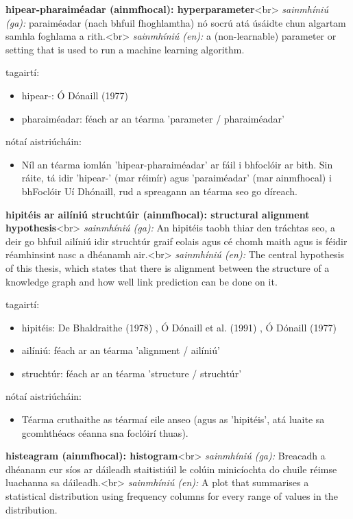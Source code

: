 \documentclass{article}
\begin{document}
\textbf{hipear-pharaiméadar (ainmfhocal): hyperparameter}<br>
\textit{sainmhíniú (ga):} paraiméadar (nach bhfuil fhoghlamtha) nó socrú atá úsáidte chun algartam samhla foghlama a rith.<br>
\textit{sainmhíniú (en):} a (non-learnable) parameter or setting that is used to run a machine learning algorithm.

tagairtí:
\begin{itemize}
	\item hipear-: Ó Dónaill (1977) \cite{odonaill}
	\item pharaiméadar: féach ar an téarma 'parameter / pharaiméadar'
\end{itemize}

nótaí aistriúcháin:
\begin{itemize}
	\item Níl an téarma iomlán 'hipear-pharaiméadar' ar fáil i bhfoclóir ar bith. Sin ráite, tá idir 'hipear-' (mar réimír) agus 'paraiméadar' (mar ainmfhocal) i bhFoclóir Uí Dhónaill, rud a spreagann an téarma seo go díreach.
\end{itemize}


\textbf{hipitéis ar ailíniú struchtúir (ainmfhocal): structural alignment hypothesis}<br>
\textit{sainmhíniú (ga):} An hipitéis taobh thiar den tráchtas seo, a deir go bhfuil ailíniú idir struchtúr graif eolais agus cé chomh maith agus is féidir réamhinsint nasc a dhéanamh air.<br>
\textit{sainmhíniú (en):} The central hypothesis of this thesis, which states that there is alignment between the structure of a knowledge graph and how well link prediction can be done on it.

tagairtí:
\begin{itemize}
	\item hipitéis: De Bhaldraithe (1978) \cite{de-bhaldraithe}, Ó Dónaill et al. (1991) \cite{focloir-beag}, Ó Dónaill (1977) \cite{odonaill}
	\item ailíniú: féach ar an téarma 'alignment / ailíniú'
	\item struchtúr: féach ar an téarma 'structure / struchtúr'
\end{itemize}

nótaí aistriúcháin:
\begin{itemize}
	\item Téarma cruthaithe as téarmaí eile anseo (agus as 'hipitéis', atá luaite sa gcomhthéacs céanna sna foclóirí thuas).
\end{itemize}


\textbf{histeagram (ainmfhocal): histogram}<br>
\textit{sainmhíniú (ga):} Breacadh a dhéanann cur síos ar dáileadh staitistiúil le colúin minicíochta do chuile réimse luachanna sa dáileadh.<br>
\textit{sainmhíniú (en):} A plot that summarises a statistical distribution using frequency columns for every range of values in the distribution.
\end{document}
